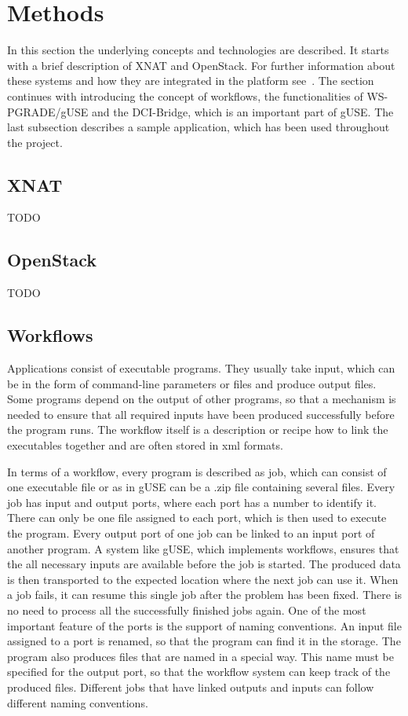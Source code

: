 \section{Methods}\label{methods}

In this section the underlying concepts and technologies are described. It starts with a brief description of XNAT and OpenStack. For further information about these systems and how they are integrated in the platform see~\cite{wu14}. The section continues with introducing the concept of workflows, the functionalities of WS-PGRADE/gUSE and the DCI-Bridge, which is an important part of gUSE. The last subsection describes a sample application, which has been used throughout the project.

\subsection{XNAT}\label{xnat}

TODO

\subsection{OpenStack}\label{openstack}

TODO

\subsection{Workflows}\label{workflows}

Applications consist of executable programs.
They usually take input, which can be in the form of command-line parameters or files and produce output files.
Some programs depend on the output of other programs, so that a mechanism is needed to ensure that all required inputs have been produced successfully before the program runs.
The workflow itself is a description or recipe how to link the executables together and are often stored in xml formats.

In terms of a workflow, every program is described as job, which can consist of one executable file or as in gUSE can be a .zip file containing several files.
Every job has input and output ports, where each port has a number to identify it.
There can only be one file assigned to each port, which is then used to execute the program.
Every output port of one job can be linked to an input port of another program.
A system like gUSE, which implements workflows, ensures that the all necessary inputs are available before the job is started.
The produced data is then transported to the expected location where the next job can use it.
When a job fails, it can resume this single job after the problem has been fixed.
There is no need to process all the successfully finished jobs again.
One of the most important feature of the ports is the support of naming conventions.
An input file assigned to a port is renamed, so that the program can find it in the storage.
The program also produces files that are named in a special way.
This name must be specified for the output port, so that the workflow system can keep track of the produced files.
Different jobs that have linked outputs and inputs can follow different naming conventions.

